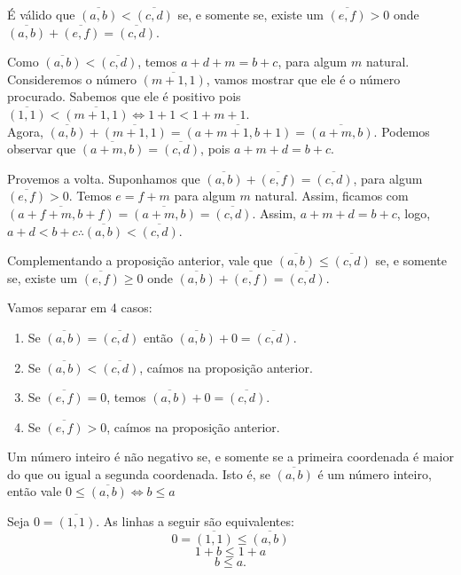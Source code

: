\documentclass[../main.tex]{subfiles}
\begin{document}
\begin{prop}
    É válido que $\overline{(a,b)} < \overline{(c,d)}$ se, e somente se, existe um $\overline{(e,f)} > 0$ onde $\overline{(a,b)} + \overline{(e,f)} = \overline{(c,d)}$.
\end{prop}
\begin{dem}
    Como $\overline{(a,b)} < \overline{(c,d)}$, temos $a+d + m = b+c$, para algum $m$ natural. Consideremos o número $\overline{(m+1, 1)}$, vamos mostrar que ele é o número procurado. Sabemos que ele é positivo pois $\overline{(1,1)} < \overline{(m+1, 1)} \iff 1+1 < 1+m+1 $. \\
    Agora, $\overline{(a,b)} + \overline{(m+1,1)} = \overline{(a+m+1,b+1)} = \overline{(a+m, b)}$.
    Podemos observar que $\overline{(a+m, b)} = \overline{(c,d)}$, pois $a+m+d = b+c$.

    Provemos a volta. Suponhamos que $\overline{(a,b)} + \overline{(e,f)} = \overline{(c,d)}$, para algum $\overline{(e,f)} > 0$. Temos $e=f+m$ para algum $m$ natural. Assim, ficamos com $\overline{(a+f+m, b+f)} = \overline{(a+m, b)} = \overline{(c,d)}$. Assim, $a+m+d = b+c$, logo, $a+d < b+c 
    \therefore \overline{(a,b)} < \overline{(c,d)}$.
\end{dem}

\begin{prop}
    Complementando a proposição anterior, vale que $\overline{(a,b)} \leq \overline{(c,d)}$ se, e somente se, existe um $\overline{(e,f)} \geq 0$ onde $\overline{(a,b)} + \overline{(e,f)} = \overline{(c,d)}$.
\end{prop}
\begin{dem}
    Vamos separar em 4 casos: \\
    \begin{enumerate}
        \item Se $\overline{(a,b)} = \overline{(c,d)}$ então $\overline{(a,b)} + 0 = \overline{(c,d)}$.
        \item Se $\overline{(a,b)} < \overline{(c,d)}$, caímos na proposição anterior.
        \item Se $\overline{(e,f)} = 0$, temos $\overline{(a,b)} + 0 = \overline{(c,d)}$.
        \item Se $\overline{(e,f)} > 0$, caímos na proposição anterior.
    \end{enumerate}
   
\end{dem}

\begin{prop}\label{int-prop-coordenadaMaior}
    Um número inteiro é não negativo se, e somente se a primeira coordenada é maior do que ou igual a segunda coordenada. 
    Isto é, se $\overline{(a,b)}$ é um número inteiro, então vale $0 \leq \overline{(a,b)}  \iff b \leq a$
\end{prop}
\begin{dem}
    Seja $0 = \overline{(1,1)}$.
    As linhas a seguir são equivalentes:
    \[ 0 = \overline{(1,1)} \leq \overline{(a,b)} \]
    \[ 1+b \leq 1+a \]
    \[ b \leq a. \]
\end{dem}
\end{document}
